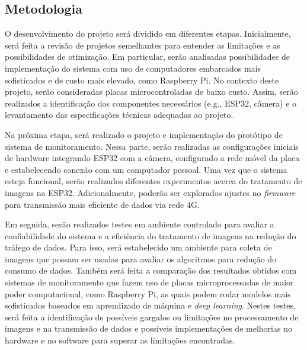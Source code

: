 \documentclass[12pt]{article}
\begin{document}
\begin{spacing}{1}
\FloatBarrier %

\subsection{Metodologia}
O desenvolvimento do projeto será dividido em diferentes etapas.
Inicialmente, será feita a revisão de projetos semelhantes para entender as limitações e as possibilidades de otimização. Em particular, serão analisadas possibilidades de implementação do sistema com uso de computadores embarcados mais sofisticados e de custo mais elevado, como Raspberry Pi. No contexto deste projeto, serão consideradas placas microcontroladas de baixo custo. Assim, serão realizados a identificação dos componentes necessários (e.g., ESP32, câmera) e o levantamento das especificações técnicas adequadas ao projeto.

Na próxima etapa, será realizado o projeto e implementação do protótipo de sistema de monitoramento.
Nessa parte, serão realizadas as configurações iniciais de hardware integrando ESP32 com a câmera, configurado a rede móvel da placa e estabelecendo conexão com um computador pessoal. Uma vez que o sistema esteja funcional, serão realizados diferentes experimentos acerca do tratamento de imagens na ESP32. Adicionalmente, poderão ser explorados ajustes no \textit{firmware} para transmissão mais eficiente de dados via rede 4G.

Em seguida, serão realizados testes em ambiente controlado para avaliar a confiabilidade do sistema e a eficiência do tratamento de imagens na redução do tráfego de dados. Para isso, será estabelecido um ambiente para coleta de imagens que possam ser usadas para avaliar os algoritmos para redução do consumo de dados. Também será feita a comparação dos resultados obtidos com sistemas de monitoramento que fazem uso de placas microprocessadas de maior poder computacional, como Raspberry Pi, as quais podem rodar modelos mais sofisticados baseados em aprendizado de máquina e \textit{deep learning}.
Nestes testes, será feita a identificação de possíveis gargalos ou limitações no processamento de imagens e na transmissão de dados e possíveis implementações de melhorias no hardware e no software para superar as limitações encontradas.


\end{spacing}
\end{document}
